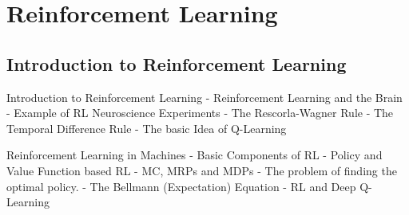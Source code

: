 \documentclass[main]{subfiles}
\begin{document}
\newpage
\section{Reinforcement Learning}

\subsection{Introduction to Reinforcement Learning}
Introduction to Reinforcement Learning
- Reinforcement Learning and the Brain
- Example of RL Neuroscience Experiments
- The Rescorla-Wagner Rule
- The Temporal Difference Rule
- The basic Idea of Q-Learning

Reinforcement Learning in Machines
- Basic Components of RL
- Policy and Value Function based RL
- MC, MRPs and MDPs
- The problem of finding the optimal policy.
- The Bellmann (Expectation) Equation
- RL and Deep Q-Learning
\end{document}
